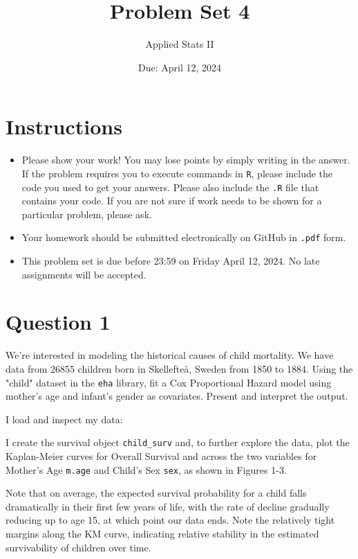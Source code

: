 \documentclass[12pt,letterpaper]{article}
\title{Problem Set 4}
\date{Due: April 12, 2024}
\author{Applied Stats II}
\begin{document}
	\maketitle
	\section*{Instructions}
	\begin{itemize}
	\item Please show your work! You may lose points by simply writing in the answer. If the problem requires you to execute commands in \texttt{R}, please include the code you used to get your answers. Please also include the \texttt{.R} file that contains your code. If you are not sure if work needs to be shown for a particular problem, please ask.
	\item Your homework should be submitted electronically on GitHub in \texttt{.pdf} form.
	\item This problem set is due before 23:59 on Friday April 12, 2024. No late assignments will be accepted.

	\end{itemize}

	\vspace{.25cm}
\section*{Question 1}
\vspace{.25cm}
\noindent We're interested in modeling the historical causes of child mortality. We have data from 26855 children born in Skellefteå, Sweden from 1850 to 1884. Using the "child" dataset in the \texttt{eha} library, fit a Cox Proportional Hazard model using mother's age and infant's gender as covariates. Present and interpret the output.
\vspace{.25cm}

\noindent I load and inspect my data:



\noindent I create the survival object \texttt{child\_surv} and, to further explore the data, plot the Kaplan-Meier curves for Overall Survival and across the two variables for Mother's Age \texttt{m.age} and Child's Sex \texttt{sex}, as shown in Figures 1-3.
\vspace{.25cm}

\noindent Note that on average, the expected survival probability for a child falls dramatically in their first few years of life, with the rate of decline gradually reducing up to age 15, at which point our data ends. Note the relatively tight margins along the KM curve, indicating relative stability in the estimated survivability of children over time.
\end{document}
